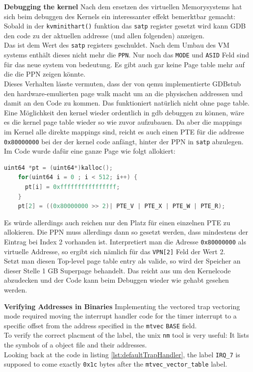 \textbf{Debugging the kernel} Nach dem ersetzen des virtuellen Memorysystems hat sich beim
debuggen des Kernels ein interessanter effekt bemerktbar gemacht: Sobald in der
\texttt{kvminithart()} funktion das \texttt{satp} register gesetzt wird kann GDB den code zu der
aktuellen addresse (und allen folgenden) anzeigen.\\
Das ist dem Wert des \texttt{satp} registers geschuldet. Nach dem Umbau des VM systems enthält
dieses nicht mehr die \texttt{PPN}. Nur noch das \texttt{MODE} und \texttt{ASID} Feld sind
für das neue system von bedeutung. Es gibt auch gar keine Page table mehr auf die die PPN zeigen
könnte.\\
Dieses Verhalten lässte vermuten, dass der von qemu implementierte GDBstub den hardware-emulierten
page walk macht um an die physischen addressen und damit an den Code zu kommen. Das funktioniert
natürlich nicht ohne page table.\\
Eine Möglichkeit den kernel wieder ordentlich in gdb debuggen zu können, wäre es die kernel
page table wieder so wie zuvor aufzubauen. Da aber die mappings im Kernel alle direkte mappings
sind, reicht es auch einen PTE für die addresse \texttt{0x80000000} bei der der kernel code
anfängt, hinter der PPN in \texttt{satp} abzulegen.\\
Im Code wurde dafür eine ganze Page wie folgt allokiert:
\begin{lstlisting}[language=c,float=h!,
    label={lst:fake_pt}]
    uint64 *pt = (uint64*)kalloc();
    for(uint64 i = 0 ; i < 512; i++) {
      pt[i] = 0xffffffffffffffff;
    }
    pt[2] = ((0x80000000 >> 2)| PTE_V | PTE_X | PTE_W | PTE_R);
\end{lstlisting}
Es würde allerdings auch reichen nur den Platz für einen einzelnen PTE
zu allokieren. Die PPN muss allerdings dann so gesetzt werden,
dass mindestens der Eintrag bei Index 2 vorhanden ist. Interpretiert man
die Adresse \texttt{0x80000000} als virtuelle Addresse, so ergibt sich
nämlich für das \texttt{VPN[2]} Feld der Wert 2.\\
Setzt man diesen Top-level page table entry als valide, so wird der Speicher
an dieser Stelle 1 GB Superpage behandelt. Das reicht aus um den Kernelcode
abzudecken und der Code kann beim Debuggen wieder wie gehabt gesehen werden.

\textbf{Verifying Addresses in Binaries} Implementing the vectored trap vectoring mode
required moving the interrupt handler code for the timer interrupt to a specific offset
from the address specified in the \texttt{mtvec} \texttt{BASE} field.\\
To verify the correct placment of the label, the unix \texttt{nm} tool is very useful:
It lists the symbols of a object file and their addresses.\\
Looking back at the code in listing \ref{lst:defaultTrapHandler}, the label \texttt{IRQ\_7}
is supposed to come exactly \texttt{0x1c} bytes after the \texttt{mtvec\_vector\_table} label.\\

